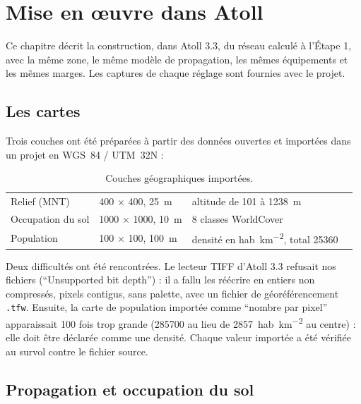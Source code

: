 \chapter{Mise en œuvre dans Atoll}
\label{ch-atoll}

Ce chapitre décrit la construction, dans Atoll 3.3, du réseau calculé à l'Étape 1, avec la même zone, le même modèle de propagation, les mêmes équipements et les mêmes marges. Les captures de chaque réglage sont fournies avec le projet.

\section{Les cartes}

Trois couches ont été préparées à partir des données ouvertes et importées dans un projet en WGS~84 / UTM~32N :

\begin{table}[H]
\centering
\caption{Couches géographiques importées.}
\label{tab-cartes}
\begin{tabularx}{\textwidth}{@{}llLl@{}}
\toprule
{} &  &  &  \\
\midrule
Relief (MNT) & \num{400} × \num{400}, \SI{25}{\metre} & altitude de 101 à \SI{1238}{\metre} & \cite{copernicusdem} \\
Occupation du sol & \num{1000} × \num{1000}, \SI{10}{\metre} & 8 classes WorldCover & \cite{worldcover2022} \\
Population & \num{100} × \num{100}, \SI{100}{\metre} & densité en \si{hab\per\kilo\metre\squared}, total \num{25360} & \cite{worldpop2018} \\
\bottomrule
\end{tabularx}
\end{table}

Deux difficultés ont été rencontrées. Le lecteur TIFF d'Atoll 3.3 refusait nos fichiers (\enquote{Unsupported bit depth}) : il a fallu les réécrire en entiers non compressés, pixels contigus, sans palette, avec un fichier de géoréférencement \texttt{.tfw}. Ensuite, la carte de population importée comme \enquote{nombre par pixel} apparaissait 100 fois trop grande (\num{285700} au lieu de \SI{2857}{hab\per\kilo\metre\squared} au centre) : elle doit être déclarée comme une densité. Chaque valeur importée a été vérifiée au survol contre le fichier source.

\section{Propagation et occupation du sol}

